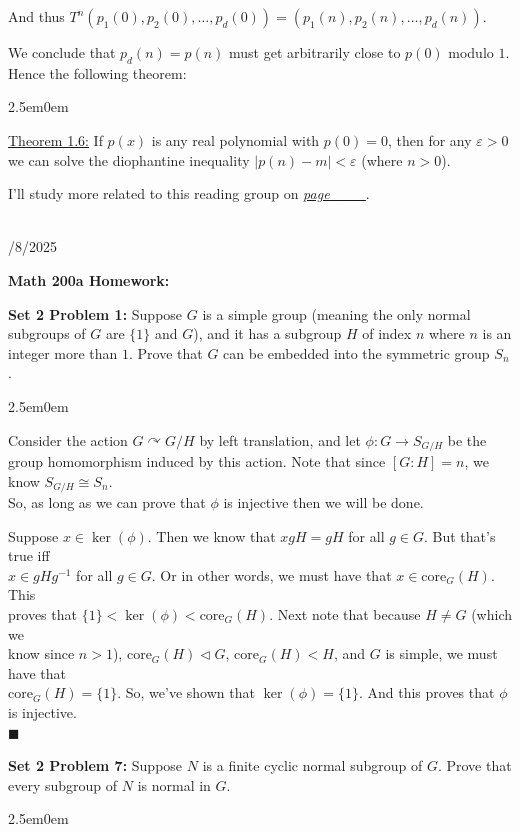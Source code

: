 \documentclass{book}
\newcommand{\inLinkRap}[2]{{\color{blue}\hyperlink{#1}{\textit{#2}}}}
\newcommand{\exTwo}{%
   \color{Purple}%
   \fontsize{13}{15}\selectfont%
}
\newcommand{\Hstatement}{%
   \color{MidnightBlue!90!Black}%
   \fontsize{12}{13}\selectfont%
}
\newcommand{\HexOne}{%
   \color{Purple}%
   \fontsize{12}{13}\selectfont%
}
\newenvironment{myIndent}{%
   \begin{adjustwidth}{2.5em}{0em}%
}{%
   \end{adjustwidth}%
}
\newcommand{\blab}[1]{\textbf{#1}}
\newcommand{\blect}[1]{{\color{MidnightBlue}\textbf{#1}}}
\newcommand{\core}{\mathrm{core}}
\newcommand{\mySepTwo}[1][.]{%
   {\noindent\color{#1}{\rule{6.5in}{0.5mm}}}\\%
}
\newcommand{\retTwo}{\hfill\bigbreak}
\newcommand{\dispDate}[1]{{
   \color{Black}%
   \fontsize{20}{18}\selectfont%
   #1\retTwo
}}
\begin{document}
And thus $T^n(p_1(0), p_2(0), \ldots, p_d(0)) = (p_1(n), p_2(n), \ldots, p_d(n))$.\retTwo

We conclude that $p_d(n) = p(n)$ must get arbitrarily close to $p(0)$ modulo $1$. Hence the following theorem:
\begin{myIndent}
\exTwo\ul{Theorem 1.6:} If $p(x)$ is any real polynomial with $p(0) = 0$, then for any $\varepsilon > 0$ we can solve the diophantine inequality $|p(n) - m| < \varepsilon$ (where $n > 0$).\retTwo
\end{myIndent}

I'll study more related to this reading group on \inLinkRap{Ergodic reading group notes 3}{page \_\_\_}.

\mySepTwo

\dispDate{10/8/2025}

\blect{Math 200a Homework:}\retTwo

\Hstatement\blab{Set 2 Problem 1:} Suppose $G$ is a simple group (meaning the only normal subgroups of $G$ are $\{1\}$ and $G$), and it has a subgroup $H$ of index $n$ where $n$ is an integer more than $1$. Prove that $G$ can be embedded into the symmetric group $S_n$.
\begin{myIndent}\HexOne
	Consider the action $G \curvearrowright G/H$ by left translation, and let $\phi: G \to S_{G/H}$ be the group homomorphism induced by this action. Note that since $[G : H] = n$, we know $S_{G/H} \cong S_n$.\\ [1pt] So, as long as we can prove that $\phi$ is injective then we will be done.\retTwo

	Suppose $x \in \ker(\phi)$. Then we know that $xgH = gH$ for all $g \in G$. But that's true iff\\ $x \in gHg^{-1}$ for all $g \in G$. Or in other words, we must have that $x \in \core_G(H)$. This\\ proves that $\{1\} < \ker(\phi) < \core_G(H)$. Next note that because $H \neq G$ (which we\\ know since $n > 1$), $\core_G(H) \lhd G$, $\core_G(H) < H$, and $G$ is simple, we must have that\\ $\core_G(H) = \{1\}$. So, we've shown that $\ker(\phi) = \{1\}$. And this proves that $\phi$ is injective.\\ $\blacksquare$\retTwo
\end{myIndent}

\blab{Set 2 Problem 7:} Suppose $N$ is a finite cyclic normal subgroup of $G$. Prove that every subgroup of $N$ is normal in $G$.
\begin{myIndent}\HexOne
	
\end{myIndent}
\end{document}
